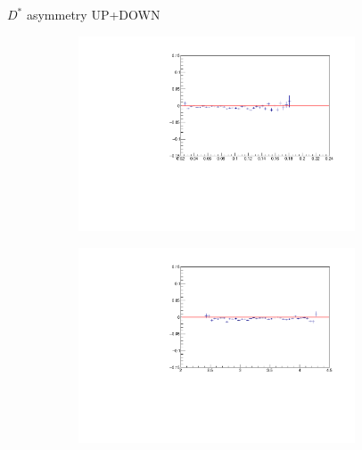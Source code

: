 \documentclass[11pt]{beamer}
\begin{document}
\begin{frame}{$D^*$ asymmetry UP+DOWN}
\begin{figure}
\begin{subfigure}{0.45\textwidth}
\end{subfigure}
\begin{subfigure}{0.45\textwidth}
\includegraphics[width=0.9\textwidth]{up_down_pdf/deviation/h_theta_reco_Dst_pos_dev.pdf}
\end{subfigure}
\begin{subfigure}{0.45\textwidth}
\includegraphics[width=0.9\textwidth]{up_down_pdf/deviation/h_eta_reco_Dst_pos_dev.pdf}
\end{subfigure}
\end{figure}
\end{frame}
\end{document}
